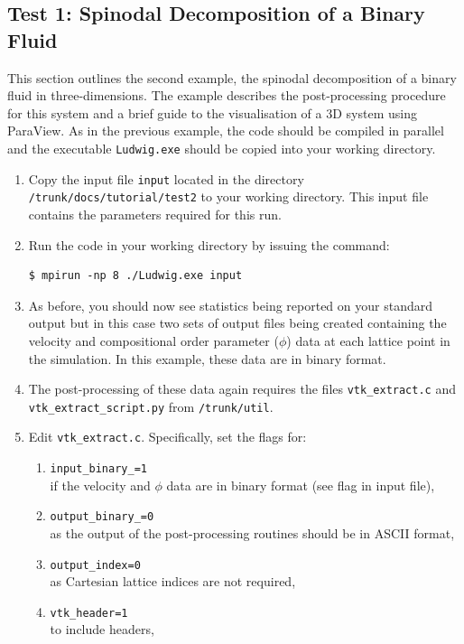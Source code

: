 \documentclass[11pt,twoside,a4paper]{article}
\begin{document}
\subsection{Test 1: Spinodal Decomposition of a Binary Fluid}

This section outlines the second example, the spinodal decomposition of a binary fluid in 
three-dimensions.
The example describes the post-processing procedure for this system and a brief guide to 
the visualisation of a 3D system using ParaView.
As in the previous example, the code should be compiled in parallel and the executable 
\texttt{Ludwig.exe} should be copied into your working directory.

\begin{enumerate}
\item Copy the input file \texttt{input} located in the directory 
\texttt{/trunk/docs/tutorial/test2} 
to your working directory. This input file contains the parameters required for this run. 
\item Run the code in your working directory by issuing the command:
\begin{lstlisting}
$ mpirun -np 8 ./Ludwig.exe input
\end{lstlisting}
\item As before, you should now see statistics being reported on your standard output but 
in this case two sets of output files being created containing the velocity and compositional
order parameter ($\phi$) data at each lattice point in the simulation. In this example, these 
data are in binary format.
\item The post-processing of these data again requires the files \texttt{vtk\_extract.c} 
and \texttt{vtk\_extract\_script.py} from \texttt{/trunk/util}.
\item Edit \texttt{vtk\_extract.c}. Specifically, set the flags for:
\begin{enumerate}
\item \texttt{input\_binary\_=1} \\ if the velocity and $\phi$ data are in binary format (see 
flag in input file),
\item \texttt{output\_binary\_=0} \\ as the output of the post-processing routines should be 
in ASCII format,
\item \texttt{output\_index=0} \\ as Cartesian lattice indices are not required, 
\item \texttt{vtk\_header=1} \\ to include headers,

\end{enumerate}
\end{enumerate}
\end{document}
